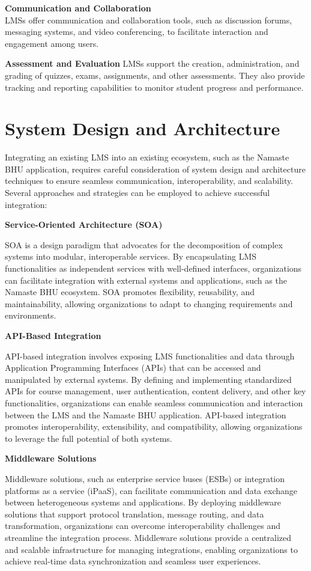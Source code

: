 \textbf{Communication and Collaboration}\\
LMSs offer communication and collaboration tools, such as discussion forums, messaging systems, and video conferencing, to facilitate interaction and engagement among users.

\textbf{Assessment and Evaluation}
LMSs support the creation, administration, and grading of quizzes, exams, assignments, and other assessments. They also provide tracking and reporting capabilities to monitor student progress and performance.


\section{System Design and Architecture}

Integrating an existing LMS into an existing ecosystem, such as the Namaste BHU application, requires careful consideration of system design and architecture techniques to ensure seamless communication, interoperability, and scalability. Several approaches and strategies can be employed to achieve successful integration:

\textbf{Service-Oriented Architecture (SOA)}

SOA is a design paradigm that advocates for the decomposition of complex systems into modular, interoperable services. By encapsulating LMS functionalities as independent services with well-defined interfaces, organizations can facilitate integration with external systems and applications, such as the Namaste BHU ecosystem. SOA promotes flexibility, reusability, and maintainability, allowing organizations to adapt to changing requirements and environments.

\textbf{API-Based Integration}

API-based integration involves exposing LMS functionalities and data through Application Programming Interfaces (APIs) that can be accessed and manipulated by external systems. By defining and implementing standardized APIs for course management, user authentication, content delivery, and other key functionalities, organizations can enable seamless communication and interaction between the LMS and the Namaste BHU application. API-based integration promotes interoperability, extensibility, and compatibility, allowing organizations to leverage the full potential of both systems.

\textbf{Middleware Solutions}

Middleware solutions, such as enterprise service buses (ESBs) or integration platforms as a service (iPaaS), can facilitate communication and data exchange between heterogeneous systems and applications. By deploying middleware solutions that support protocol translation, message routing, and data transformation, organizations can overcome interoperability challenges and streamline the integration process. Middleware solutions provide a centralized and scalable infrastructure for managing integrations, enabling organizations to achieve real-time data synchronization and seamless user experiences.

